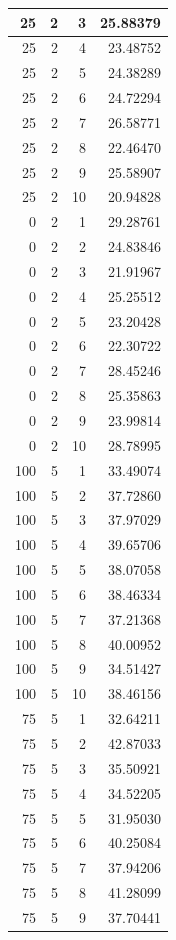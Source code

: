 \documentclass[
]{article}
\begin{document}
\begin{table}
\begin{tabular}[t]{r|r|r|r}
\hline
25 & 2 & 3 & 25.88379\\
\hline
25 & 2 & 4 & 23.48752\\
\hline
25 & 2 & 5 & 24.38289\\
\hline
25 & 2 & 6 & 24.72294\\
\hline
25 & 2 & 7 & 26.58771\\
\hline
25 & 2 & 8 & 22.46470\\
\hline
25 & 2 & 9 & 25.58907\\
\hline
25 & 2 & 10 & 20.94828\\
\hline
0 & 2 & 1 & 29.28761\\
\hline
0 & 2 & 2 & 24.83846\\
\hline
0 & 2 & 3 & 21.91967\\
\hline
0 & 2 & 4 & 25.25512\\
\hline
0 & 2 & 5 & 23.20428\\
\hline
0 & 2 & 6 & 22.30722\\
\hline
0 & 2 & 7 & 28.45246\\
\hline
0 & 2 & 8 & 25.35863\\
\hline
0 & 2 & 9 & 23.99814\\
\hline
0 & 2 & 10 & 28.78995\\
\hline
100 & 5 & 1 & 33.49074\\
\hline
100 & 5 & 2 & 37.72860\\
\hline
100 & 5 & 3 & 37.97029\\
\hline
100 & 5 & 4 & 39.65706\\
\hline
100 & 5 & 5 & 38.07058\\
\hline
100 & 5 & 6 & 38.46334\\
\hline
100 & 5 & 7 & 37.21368\\
\hline
100 & 5 & 8 & 40.00952\\
\hline
100 & 5 & 9 & 34.51427\\
\hline
100 & 5 & 10 & 38.46156\\
\hline
75 & 5 & 1 & 32.64211\\
\hline
75 & 5 & 2 & 42.87033\\
\hline
75 & 5 & 3 & 35.50921\\
\hline
75 & 5 & 4 & 34.52205\\
\hline
75 & 5 & 5 & 31.95030\\
\hline
75 & 5 & 6 & 40.25084\\
\hline
75 & 5 & 7 & 37.94206\\
\hline
75 & 5 & 8 & 41.28099\\
\hline
75 & 5 & 9 & 37.70441\\

\end{tabular}
\end{table}
\end{document}
